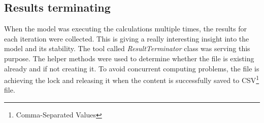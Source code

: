 \subsection{Results terminating}\label{subsec:results-terminating}
When the model was executing the calculations multiple times, the results for each iteration were collected.
This is giving a really interesting insight into the model and its stability.
The tool called \textit{ResultTerminator} class was serving this purpose.
The helper methods were used to determine whether the file is existing already and if not creating it.
To avoid concurrent computing problems, the file is achieving the lock and releasing it when the content is successfully saved to CSV\footnote{Comma-Separated Values} file.